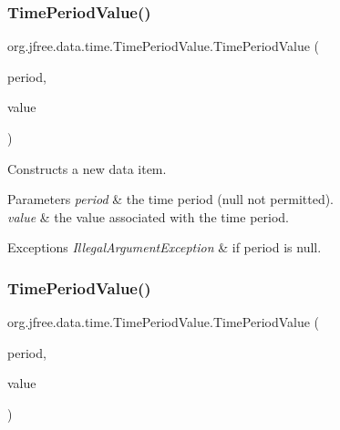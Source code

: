 \subsubsection{\texorpdfstring{Time\+Period\+Value()}{TimePeriodValue()}\hspace{0.1cm}{\footnotesize\ttfamily [1/2]}}
{\footnotesize\ttfamily org.\+jfree.\+data.\+time.\+Time\+Period\+Value.\+Time\+Period\+Value (\begin{DoxyParamCaption}\item[{\mbox{\hyperlink{interfaceorg_1_1jfree_1_1data_1_1time_1_1_time_period}{Time\+Period}}}]{period,  }\item[{Number}]{value }\end{DoxyParamCaption})}

Constructs a new data item.


\begin{DoxyParams}{Parameters}
{\em period} & the time period ({\ttfamily null} not permitted). \\
\hline
{\em value} & the value associated with the time period.\\
\hline
\end{DoxyParams}

\begin{DoxyExceptions}{Exceptions}
{\em Illegal\+Argument\+Exception} & if {\ttfamily period} is {\ttfamily null}. \\
\hline
\end{DoxyExceptions}
\mbox{\label{classorg_1_1jfree_1_1data_1_1time_1_1_time_period_value_ada504ce84556ff0c9910079795e94f76}} 
\subsubsection{\texorpdfstring{Time\+Period\+Value()}{TimePeriodValue()}\hspace{0.1cm}{\footnotesize\ttfamily [2/2]}}
{\footnotesize\ttfamily org.\+jfree.\+data.\+time.\+Time\+Period\+Value.\+Time\+Period\+Value (\begin{DoxyParamCaption}\item[{\mbox{\hyperlink{interfaceorg_1_1jfree_1_1data_1_1time_1_1_time_period}{Time\+Period}}}]{period,  }\item[{double}]{value }\end{DoxyParamCaption})}

